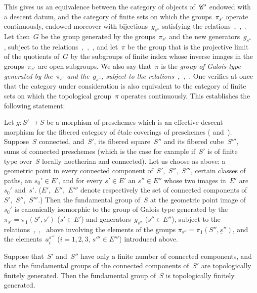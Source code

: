 This gives us an equivalence between the category of objects
of~$\cal{C}'$ endowed with a
descent datum, and the category of finite sets on which the
groups~$\pi_{s'}$ operate continuously, endowed moreover with
bijections~$g_{s''}$ satisfying the
relations~,~,~. Let
then~$G$ be the group generated by the groups~$\pi_{s'}$ and the new
generators~$g_{s''}$, subject to the
relations~,~,~, and
let~$\pi$ be the group that is the projective limit of the quotients
of~$G$ by the subgroups of finite index whose inverse images in the
groups~$\pi_{s'}$ are open subgroups. We also say that~$\pi$ is the
\emph{group of Galois type generated by the~$\pi_{s'}$ and
the~$g_{s''}$, subject to the
relations~,~,~}. One
verifies at once that the category under consideration is also
equivalent to the category of finite sets on which the topological
group~$\pi$ operates continuously. This establishes the following
statement:
\begin{theorem}
\label{IX.5.1}
Let $g\colon S'\to S$ be a morphism of preschemes which is an
effective descent morphism for the fibered category of étale
coverings of preschemes (\cf {} and~).
Suppose~$S$ connected, and~$S'$, its fibered square~$S''$ and its
fibered cube~$S'''$, sums of connected preschemes (which is the case
for example if~$S'$ is of finite type over~$S$ locally noetherian and
connected). Let us choose as above: a geometric point in every
connected component of~$S'$,~$S''$,~$S'''$, certain classes of
paths, an $s_0'\in E'$, and for every $s'\in E'$ an
$s''\in E''$
whose two images in~$E'$ are~$s_0'$ and~$s'$.
($E'$,~$E''$,~$E'''$ denote respectively the set of connected
components of~$S'$,~$S''$,~$S'''$.) Then the fundamental group
of~$S$ at the geometric point image of~$s_0'$ is canonically
isomorphic to the group of Galois type generated by the
$\pi_{s'}=\pi_1(S',\underline{s}')$ ($s'\in E'$) and
generators~$g_{s''}$ ($s''\in E''$), subject to the
relations~,~,~ above
involving the elements of the groups
$\pi_{s''}=\pi_1(S'',\underline{s}'')$, and the
elements~$a_i^{s'''}$ ($i=1,2,3$, $s'''\in E'''$) introduced above.
\end{theorem}

\begin{corollary}
\label{IX.5.2}
Suppose that~$S'$ and~$S''$ have only a finite number of connected
components, and that the fundamental groups of the connected
components of~$S'$ are topologically finitely generated. Then the
fundamental group of~$S$ is topologically finitely generated.
\end{corollary}

